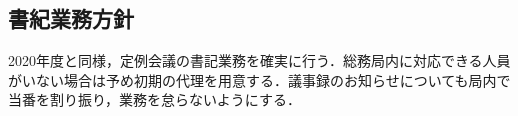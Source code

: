 \subsection*{書紀業務方針}


2020年度と同様，定例会議の書記業務を確実に行う．総務局内に対応できる人員がいない場合は予め初期の代理を用意する．議事録のお知らせについても局内で当番を割り振り，業務を怠らないようにする．
